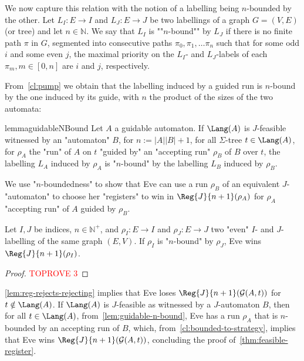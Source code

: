 \documentclass[a4paper,UKenglish,cleveref, autoref, thm-restate]{lipics-v2021}
\newcommand{\NN}{\mathbb{N}}
\newcommand{\G}{\mathcal{G}}
\begin{document}
\AP We now capture this relation with the notion of a labelling being $n$-bounded by the other. Let $L_I: E\rightarrow I$ and $L_J:E\rightarrow J$ be two labellings of a graph $G= (V,E)$ (or tree) and let $n \in \NN$. We say that $L_I$ is ""$n$-bound"" by $L_J$ if there is no finite path $\pi$ in $G$, segmented into consecutive paths $\pi_0,\pi_1,\dots \pi_n$ such that for some odd $i$ and some even $j$, the maximal priority on the $L_I$- and $L_J$-labels of each $\pi_m, m\in [0,n]$ are $i$ and $j$, respectively.

From~\cref{cl:pump} we obtain that the labelling induced by a guided run is $n$-bound by the one induced by its guide, with $n$ the product of the sizes of the two automata:

\begin{restatable}{lemma}{guidableNBound}\label{lem:guidable-n-bound}
	Let $A$ a guidable automaton. If $\Lang(A)$ is $J$-feasible witnessed by an "automaton" $B$, for $n := |A| |B|+1$, for all $\Sigma$-tree $t \in \Lang(A)$, for $\rho_A$ the "run" of $A$ on $t$ "guided by" an "accepting run" $\rho_B$ of $B$ over $t$, the labelling $L_A$ induced by $\rho_A$ is "$n$-bound" by the labelling $L_B$ induced by $\rho_B$.
\end{restatable}



We use "$n$-boundedness" to show that Eve can use a run $\rho_B$ of an equivalent $J$-"automaton" to choose her "registers" to win in $\Reg{J}{n+1}(\rho_A)$ for $\rho_A$ "accepting run" of $A$ guided by $\rho_B$.

\begin{lemma}\label{cl:bounded-to-strategy}
	Let $I,J$ be indices, $n \in \NN^+$, and $\rho_I:E\rightarrow I$ and $\rho_J:E\rightarrow J$ two "even" $I$- and $J$- labelling of the same graph $(E,V)$. If $\rho_I$ is "$n$-bound" by $\rho_J$, Eve wins $\Reg{J}{n+1}(\rho_I)$.
\end{lemma}
\begin{proof}\textcolor{red}{TOPROVE 3}\end{proof}

\cref{lem:reg-rejects-rejecting} implies that Eve loses $\Reg{J}{n+1}(\G(A,t))$ for $t\notin \Lang(A)$. If $\Lang(A)$ is $J$-feasible as witnessed by a $J$-automaton $B$, then for all $t\in \Lang(A)$, from~\cref{lem:guidable-n-bound}, Eve has a run $\rho_A$ that is $n$-bounded by an accepting run of $B$, which, from~\cref{cl:bounded-to-strategy}, implies that Eve wins $\Reg{J}{n+1}(\G(A,t))$, concluding the proof of~\cref{thm:feasible-register}.
\end{document}

